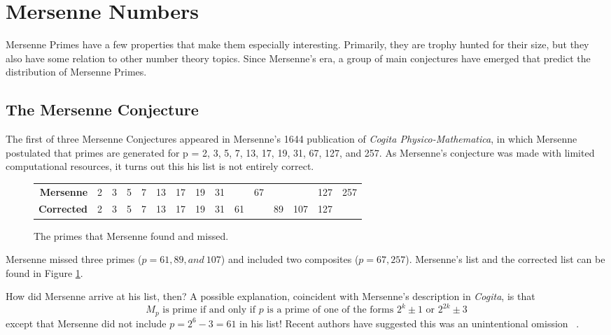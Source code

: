 \section{Mersenne Numbers}

Mersenne Primes have a few properties that make them especially interesting. Primarily, they
are trophy hunted for their size, but they also have some relation to other number theory topics. Since Mersenne's era, a group of main conjectures have emerged that predict the distribution of Mersenne Primes.

\subsection{The Mersenne Conjecture}
The first of three Mersenne Conjectures appeared in Mersenne's 1644 publication of 
\textit{Cogita Physico-Mathematica}, in which Mersenne postulated that primes are generated for p = 2, 3, 5,
7, 13, 17, 19, 31, 67, 127, and 257. As Mersenne's conjecture was made with limited computational
resources, it turns out this his list is not entirely correct.
\begin{figure}[h]
\begin{tabular}{rcccccccccccccc}
\textbf{Mersenne}&2&3&5&7&13&17&19&31&&67&&&127&257\\
\textbf{Corrected}&2&3&5&7&13&17&19&31&61&&89&107&127&
\end{tabular}
\caption{The primes that Mersenne found and missed.}
\label{fig:conj}
\end{figure}

Mersenne missed three primes ($p = 61, 89, and~107$) and included two composites ($p = 67, 257$). Mersenne's list and the corrected list can be found in Figure \ref{fig:conj}.

How did Mersenne arrive at his list, then? A possible explanation, coincident with Mersenne's description in
\textit{Cogita}, is that
\begin{equation*}
    M_p \text{ is prime if and only if $p$ is a prime of one of the forms } 2^k\pm1 \text{ or } 2^{2k}\pm3
\end{equation*}
except that Mersenne did not include $p = 2^{6}-3 = 61$ in his list! Recent authors have
suggested this was an unintentional omission ~\cite{newconjecture}.


